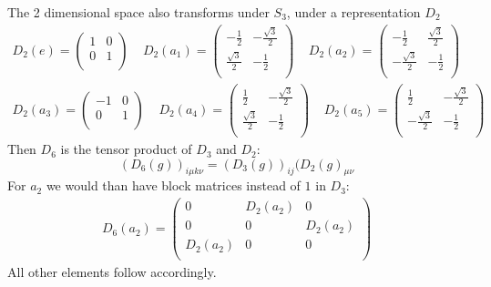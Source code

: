 \documentclass[a4paper]{article}
\theoremstyle{definition}
\theoremstyle{definition}
\theoremstyle{definition}
\theoremstyle{theorem}
\theoremstyle{theorem}
\theoremstyle{definition}
\begin{document}
The 2 dimensional space also transforms under $S_3$, under a representation $D_2$
\begin{align}
    D_2(e) =
    \begin{pmatrix}
        1 & 0 \\
        0 & 1 \\
    \end{pmatrix} \;\;\;\;
    D_2(a_1) = \begin{pmatrix}
        -\frac{1}{2} & -\frac{\sqrt{3}}{2} \\
        \frac{\sqrt{3}}{2} & -\frac{1}{2} \\
    \end{pmatrix} \;\;\;\;
    D_2(a_2) =
    \begin{pmatrix}
        -\frac{1}{2} & \frac{\sqrt{3}}{2} \\
        -\frac{\sqrt{3}}{2} & -\frac{1}{2} \\
    \end{pmatrix} \;\;\;\; \\
    D_2(a_3) =
    \begin{pmatrix}
        -1 & 0 \\
        0 & 1 \\
    \end{pmatrix} \;\;\;\;
    D_2(a_4) = \begin{pmatrix}
        \frac{1}{2} & -\frac{\sqrt{3}}{2} \\
        \frac{\sqrt{3}}{2} & -\frac{1}{2} \\
    \end{pmatrix} \;\;\;\;
    D_2(a_5) =
    \begin{pmatrix}
        \frac{1}{2} & -\frac{\sqrt{3}}{2} \\
        -\frac{\sqrt{3}}{2} & -\frac{1}{2} \\
    \end{pmatrix} \;\;\;\;
\end{align}
Then $D_6$ is the tensor product of $D_3$ and $D_2$:
\begin{equation}
    (D_6(g))_{i\mu k\nu}=(D_3(g))_{ij}(D_2(g)_{\mu \nu}
\end{equation}
For $a_2$ we would than have block matrices instead of $1$ in $D_3$:
\begin{align}
    D_6(a_2) =
    \begin{pmatrix}
        0 & D_2(a_2) & 0 \\
        0 & 0 & D_2(a_2) \\
        D_2(a_2) & 0 & 0 \\
    \end{pmatrix}
\end{align}
All other elements follow accordingly.
\end{document}
